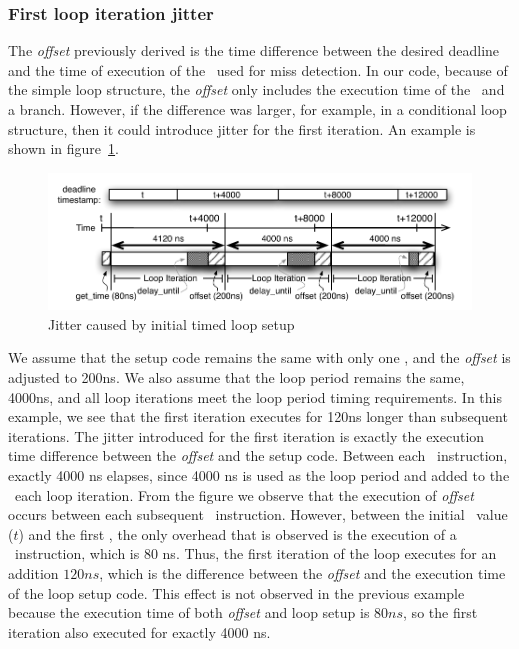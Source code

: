 \subsubsection{First loop iteration jitter}
The \emph{offset} previously derived is the time difference between the desired deadline and the time of execution of the \gettime\ used for miss detection.  
In our code, because of the simple loop structure, the \emph{offset} only includes the execution time of the \delayuntil\ and a branch. 
However, if the difference was larger, for example, in a conditional loop structure, then it could introduce jitter for the first iteration.
An example is shown in figure~\ref{fig:setup_look_timing}.
\begin{figure}[h]
  \vspace{-3mm}
  \begin{center}
    \includegraphics[scale=.9]{figs/setup_loop_timing}
  \end{center}
  \vspace{-3mm}
  \caption{Jitter caused by initial timed loop setup}
  \label{fig:setup_look_timing}
\end{figure}
We assume that the setup code remains the same with only one \gettime, and the \emph{offset} is adjusted to 200ns.
We also assume that the loop period remains the same, 4000ns, and all loop iterations meet the loop period timing requirements. 
In this example, we see that the first iteration executes for 120ns longer than subsequent iterations.
The jitter introduced for the first iteration is exactly the execution time difference between the \emph{offset} and the setup code.  
Between each \delayuntil\ instruction, exactly 4000 ns elapses, since 4000 ns is used as the loop period and added to the \deadlinet\ each loop iteration.   
From the figure we observe that the execution of \emph{offset} occurs between each subsequent \delayuntil\ instruction.
However, between the initial \deadlinet\ value ($t$) and the first \delayuntil, the only overhead that is observed is the execution of a \gettime\ instruction, which is 80 ns. 
Thus, the first iteration of the loop executes for an addition $120ns$, which is the difference between the \emph{offset} and the execution time of the loop setup code.
This effect is not observed in the previous example because the execution time of both \emph{offset} and loop setup is $80 ns$, so the first iteration also executed for exactly 4000 ns.   

